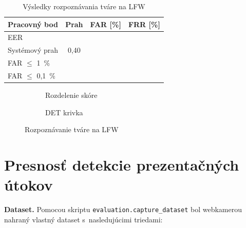 
\begin{table}[H]
  \centering
  \caption{Výsledky rozpoznávania tváre na LFW}
  \label{tab:lfw}
  \begin{tabular}{@{}lccc@{}}
    \toprule
    Pracovný bod & Prah & FAR [\%] & FRR [\%] \\
    \midrule
    EER & \todo{} & \todo{} & \todo{} \\
    Systémový prah & 0,40 & \todo{} & \todo{} \\
    FAR $\le$ 1~\% & \todo{} & \todo{} & \todo{} \\
    FAR $\le$ 0,1~\% & \todo{} & \todo{} & \todo{} \\
    \bottomrule
  \end{tabular}
\end{table}

\begin{figure}[H]
  \centering
  \begin{subfigure}{0.49\textwidth}
    \centering
    \caption{Rozdelenie skóre}
  \end{subfigure}
  \hfill
  \begin{subfigure}{0.49\textwidth}
    \centering
    \caption{DET krivka}
  \end{subfigure}
  \caption{Rozpoznávanie tváre na LFW}
  \label{fig:lfw}
\end{figure}


\section{Presnosť detekcie prezentačných útokov}

\textbf{Dataset.} Pomocou skriptu \texttt{evaluation.capture\_dataset} bol webkamerou
nahraný vlastný dataset s~nasledujúcimi triedami:

